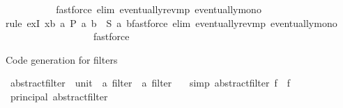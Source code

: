 \begin{isabellebody}
\ \ \ \ \ \ \ \ \isamarkupfalse%
\ \isamarkupfalse%
{\isacharparenleft}{\kern0pt}fastforce\ elim{\isacharcolon}{\kern0pt}\ eventually{\isacharunderscore}{\kern0pt}rev{\isacharunderscore}{\kern0pt}mp\ eventually{\isacharunderscore}{\kern0pt}mono{\isacharparenright}{\kern0pt}\isanewline
\ \ \ \ \ \ \ \ \isamarkupfalse%
\isanewline
\ \ \ \ \ \ \ \ \ \ \isamarkupfalse%
{\isacharparenleft}{\kern0pt}rule\ exI{\isacharbrackleft}{\kern0pt}\ x{\isacharequal}{\kern0pt}{\isachardoublequoteopen}{\isasymlambda}b{\isachardot}{\kern0pt}\ {\isasymexists}a{\isachardot}{\kern0pt}\ P{\isacharprime}{\kern0pt}{\isacharprime}{\kern0pt}\ {\isacharparenleft}{\kern0pt}a{\isacharcomma}{\kern0pt}\ b{\isacharparenright}{\kern0pt}\ {\isasymand}\ S\ a\ b{\isachardoublequoteclose}{\isacharbrackright}{\kern0pt}{\isacharparenright}{\kern0pt}{\isacharparenleft}{\kern0pt}fastforce\ elim{\isacharcolon}{\kern0pt}\ eventually{\isacharunderscore}{\kern0pt}rev{\isacharunderscore}{\kern0pt}mp\ eventually{\isacharunderscore}{\kern0pt}mono{\isacharparenright}{\kern0pt}\isanewline
\ \ \ \ \ \ \ \ \isamarkupfalse%
\isanewline
\ \ \ \ \ \ \isamarkupfalse%
\ \isamarkupfalse%
\ fastforce\isanewline
\ \ \ \ \ \ \isamarkupfalse%
\isanewline
\ \ \isamarkupfalse%
\isanewline
{}\isamarkupfalse%
%
\endisatagproof
{\isafoldproof}%
%
\isadelimproof
\isanewline
%
\endisadelimproof
\isanewline
{}\isamarkupfalse%
%
\begin{isamarkuptext}%
Code generation for filters%
\end{isamarkuptext}\isamarkuptrue%
\isamarkupfalse%
\ abstract{\isacharunderscore}{\kern0pt}filter\ {\isacharcolon}{\kern0pt}{\isacharcolon}{\kern0pt}\ {\isachardoublequoteopen}{\isacharparenleft}{\kern0pt}unit\ {\isasymRightarrow}\ {\isacharprime}{\kern0pt}a\ filter{\isacharparenright}{\kern0pt}\ {\isasymRightarrow}\ {\isacharprime}{\kern0pt}a\ filter{\isachardoublequoteclose}\isanewline
\ \ \ {\isacharbrackleft}{\kern0pt}simp{\isacharbrackright}{\kern0pt}{\isacharcolon}{\kern0pt}\ {\isachardoublequoteopen}abstract{\isacharunderscore}{\kern0pt}filter\ f\ {\isacharequal}{\kern0pt}\ f\ {\isacharparenleft}{\kern0pt}{\isacharparenright}{\kern0pt}{\isachardoublequoteclose}\isanewline
\isanewline
{}\isamarkupfalse%
\ principal\ abstract{\isacharunderscore}{\kern0pt}filter\isanewline
\isanewline

\end{isabellebody}
